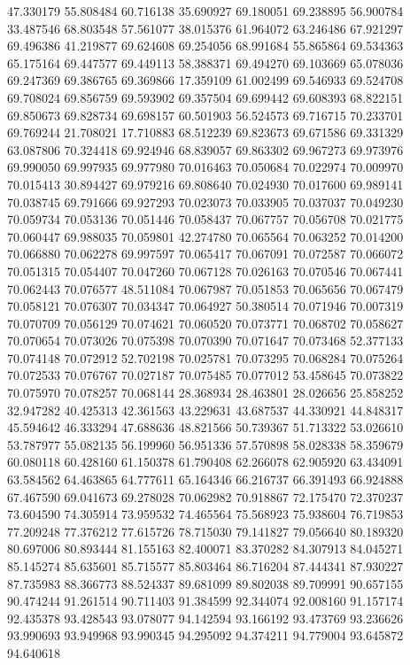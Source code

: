 47.330179
55.808484
60.716138
35.690927
69.180051
69.238895
56.900784
33.487546
68.803548
57.561077
38.015376
61.964072
63.246486
67.921297
69.496386
41.219877
69.624608
69.254056
68.991684
55.865864
69.534363
65.175164
69.447577
69.449113
58.388371
69.494270
69.103669
65.078036
69.247369
69.386765
69.369866
17.359109
61.002499
69.546933
69.524708
69.708024
69.856759
69.593902
69.357504
69.699442
69.608393
68.822151
69.850673
69.828734
69.698157
60.501903
56.524573
69.716715
70.233701
69.769244
21.708021
17.710883
68.512239
69.823673
69.671586
69.331329
63.087806
70.324418
69.924946
68.839057
69.863302
69.967273
69.973976
69.990050
69.997935
69.977980
70.016463
70.050684
70.022974
70.009970
70.015413
30.894427
69.979216
69.808640
70.024930
70.017600
69.989141
70.038745
69.791666
69.927293
70.023073
70.033905
70.037037
70.049230
70.059734
70.053136
70.051446
70.058437
70.067757
70.056708
70.021775
70.060447
69.988035
70.059801
42.274780
70.065564
70.063252
70.014200
70.066880
70.062278
69.997597
70.065417
70.067091
70.072587
70.066072
70.051315
70.054407
70.047260
70.067128
70.026163
70.070546
70.067441
70.062443
70.076577
48.511084
70.067987
70.051853
70.065656
70.067479
70.058121
70.076307
70.034347
70.064927
50.380514
70.071946
70.007319
70.070709
70.056129
70.074621
70.060520
70.073771
70.068702
70.058627
70.070654
70.073026
70.075398
70.070390
70.071647
70.073468
52.377133
70.074148
70.072912
52.702198
70.025781
70.073295
70.068284
70.075264
70.072533
70.076767
70.027187
70.075485
70.077012
53.458645
70.073822
70.075970
70.078257
70.068144
28.368934
28.463801
28.026656
25.858252
32.947282
40.425313
42.361563
43.229631
43.687537
44.330921
44.848317
45.594642
46.333294
47.688636
48.821566
50.739367
51.713322
53.026610
53.787977
55.082135
56.199960
56.951336
57.570898
58.028338
58.359679
60.080118
60.428160
61.150378
61.790408
62.266078
62.905920
63.434091
63.584562
64.463865
64.777611
65.164346
66.216737
66.391493
66.924888
67.467590
69.041673
69.278028
70.062982
70.918867
72.175470
72.370237
73.604590
74.305914
73.959532
74.465564
75.568923
75.938604
76.719853
77.209248
77.376212
77.615726
78.715030
79.141827
79.056640
80.189320
80.697006
80.893444
81.155163
82.400071
83.370282
84.307913
84.045271
85.145274
85.635601
85.715577
85.803464
86.716204
87.444341
87.930227
87.735983
88.366773
88.524337
89.681099
89.802038
89.709991
90.657155
90.474244
91.261514
90.711403
91.384599
92.344074
92.008160
91.157174
92.435378
93.428543
93.078077
94.142594
93.166192
93.473769
93.236626
93.990693
93.949968
93.990345
94.295092
94.374211
94.779004
93.645872
94.640618
